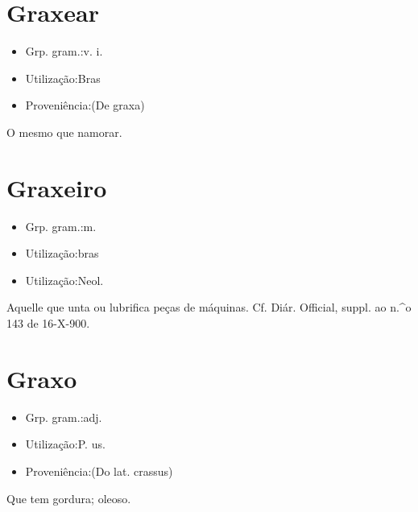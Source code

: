 \section{Graxear}
\begin{itemize}
\item {Grp. gram.:v. i.}
\end{itemize}
\begin{itemize}
\item {Utilização:Bras}
\end{itemize}
\begin{itemize}
\item {Proveniência:(De \textunderscore graxa\textunderscore )}
\end{itemize}
O mesmo que \textunderscore namorar\textunderscore .
\section{Graxeiro}
\begin{itemize}
\item {Grp. gram.:m.}
\end{itemize}
\begin{itemize}
\item {Utilização:bras}
\end{itemize}
\begin{itemize}
\item {Utilização:Neol.}
\end{itemize}
Aquelle que unta ou lubrifica peças de máquinas. Cf. \textunderscore Diár. Official\textunderscore , suppl. ao n.^o 143 de 16-X-900.
\section{Graxo}
\begin{itemize}
\item {Grp. gram.:adj.}
\end{itemize}
\begin{itemize}
\item {Utilização:P. us.}
\end{itemize}
\begin{itemize}
\item {Proveniência:(Do lat. \textunderscore crassus\textunderscore )}
\end{itemize}
Que tem gordura; oleoso.
